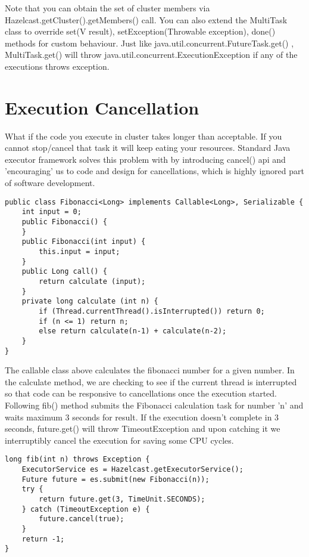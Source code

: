 Note that you can obtain the set of cluster members via Hazelcast.getCluster().getMembers() call. You can also extend the MultiTask class to override set(V result), setException(Throwable exception), done() methods for custom behaviour. Just like java.util.concurrent.FutureTask.get() , MultiTask.get() will throw java.util.concurrent.ExecutionException if any of the executions throws exception.

\section{Execution Cancellation}

What if the code you execute in cluster takes longer than acceptable. If you cannot stop/cancel that task it will keep eating your resources. Standard Java executor framework solves this problem with by introducing cancel() api and 'encouraging' us to code and design for cancellations, which is highly ignored part of software development.

\begin{verbatim}
public class Fibonacci<Long> implements Callable<Long>, Serializable {
    int input = 0; 
    public Fibonacci() { 
    } 
    public Fibonacci(int input) { 
        this.input = input;
    } 
    public Long call() {
        return calculate (input);
    }
    private long calculate (int n) {
        if (Thread.currentThread().isInterrupted()) return 0;
        if (n <= 1) return n;
        else return calculate(n-1) + calculate(n-2);
    }
}
\end{verbatim}

The callable class above calculates the fibonacci number for a given number. In the calculate method, we are checking to see if the current thread is interrupted so that code can be responsive to cancellations once the execution started. Following fib() method submits the Fibonacci calculation task for number 'n' and waits maximum 3 seconds for result. If the execution doesn't complete in 3 seconds, future.get() will throw TimeoutException and upon catching it we interruptibly cancel the execution for saving some CPU cycles.

\begin{verbatim}
long fib(int n) throws Exception {
    ExecutorService es = Hazelcast.getExecutorService();
    Future future = es.submit(new Fibonacci(n));  
    try {
        return future.get(3, TimeUnit.SECONDS);
    } catch (TimeoutException e) {
        future.cancel(true);            
    }
    return -1;
}
\end{verbatim}
	
